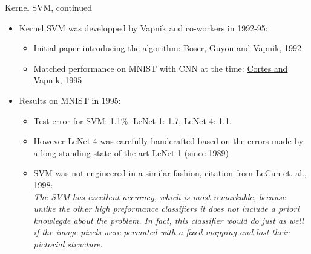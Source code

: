 \documentclass[handout]{beamer}   %
\begin{document}
\begin{frame}{Kernel SVM, continued}
  \begin{itemize}[<+->]
  \item Kernel SVM was developped by Vapnik and co-workers in 1992-95:
    \begin{itemize}
    \item Initial paper introducing the algorithm:
      \href{http://www.svms.org/training/BOGV92.pdf}{Boser, Guyon and Vapnik, 1992}
    \item Matched performance on MNIST with CNN at the time:
      \href{http://image.diku.dk/imagecanon/material/cortes_vapnik95.pdf}{Cortes and Vapnik, 1995}
    \end{itemize}
  \item Results on MNIST in 1995:
    \begin{itemize}[<+->]
    \item Test error for SVM: 1.1\%. LeNet-1: 1.7, LeNet-4: 1.1.
    \item However LeNet-4 was carefully handcrafted based on the errors made by a long standing
      state-of-the-art LeNet-1 (since 1989)
    \item SVM was not engineered in a similar fashion, citation from
      \href{http://yann.lecun.com/exdb/publis/pdf/lecun-98.pdf}{LeCun et. al., 1998}:\\
      {\it
      The SVM has excellent accuracy, which is most remarkable, because unlike the other
      high preformance classifiers it does not include a priori knowlegde about the problem.
      In fact, this classifier would do just as well if the image pixels were permuted
      with a fixed mapping and lost their pictorial structure.}
    \end{itemize}
  \end{itemize}
\end{frame}
\end{document}
